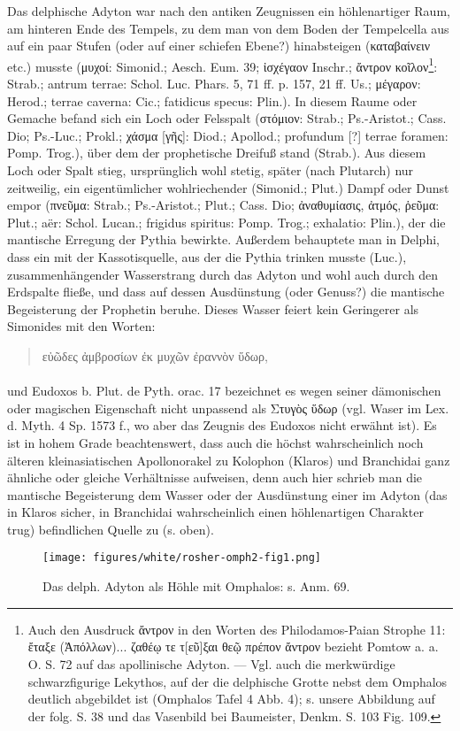 \documentclass[a4paper, 11pt, oneside]{article}
\begin{document}
Das delphische Adyton war nach den antiken Zeugnissen ein höhlenartiger Raum, am hinteren Ende des Tempels, zu dem man von dem Boden der Tempelcella aus auf ein paar Stufen (oder auf einer schiefen Ebene?) hinabsteigen (καταβαίνειν etc.) musste (μυχοί: Simonid.; Aesch. Eum. 39; ἰσχέγαον Inschr.; ἄντρον κοῖλον\footnote{Auch den Ausdruck ἄντρον in den Worten des Philodamos-Paian Strophe 11: ἔταξε (Ἀπόλλων)... ζαθέῳ τε τ[εῦ]ξαι θεῷ πρέπον ἄντρον bezieht Pomtow a. a. O. S. 72 auf das apollinische Adyton. --- Vgl. auch die merkwürdige schwarzfigurige Lekythos, auf der die delphische Grotte nebst dem Omphalos deutlich abgebildet ist (Omphalos Tafel 4 Abb. 4); s. unsere Abbildung auf der folg. S. 38 und das Vasenbild bei Baumeister, Denkm. S. 103 Fig. 109.}: Strab.; antrum terrae: Schol. Luc. Phars. 5, 71 ff. p. 157, 21 ff. Us.; μέγαρον: Herod.; terrae caverna: Cic.; fatidicus specus: Plin.). In diesem Raume oder Gemache befand sich ein Loch oder Felsspalt (στόμιον: Strab.; Ps.-Aristot.; Cass. Dio; Ps.-Luc.; Prokl.; χάσμα [γῆς]: Diod.; Apollod.; profundum [?] terrae foramen: Pomp. Trog.), über dem der prophetische Dreifuß stand (Strab.). Aus diesem Loch oder Spalt stieg, ursprünglich wohl stetig, später (nach Plutarch) nur zeitweilig, ein eigentümlicher wohlriechender (Simonid.; Plut.) Dampf oder Dunst empor (πνεῦμα: Strab.; Ps.-Aristot.; Plut.; Cass. Dio; ἀναθυμίασις, ἀτμός, ῥεῦμα: Plut.; aër: Schol. Lucan.; frigidus spiritus: Pomp. Trog.; exhalatio: Plin.), der die mantische Erregung der Pythia bewirkte. Außerdem behauptete man in Delphi, dass ein mit der Kassotisquelle, aus der die Pythia trinken musste (Luc.), zusammenhängender Wasserstrang durch das Adyton und wohl auch durch den Erdspalte fließe, und dass auf dessen Ausdünstung (oder Genuss?) die mantische Begeisterung der Prophetin beruhe. Dieses Wasser feiert kein Geringerer als Simonides mit den Worten:
\begin{quotation}
εὐῶδες ἀμβροσίων ἐκ μυχῶν ἐραννὸν ὕδωρ,
\end{quotation}
\paragraph{}
und Eudoxos b. Plut. de Pyth. orac. 17 bezeichnet es wegen seiner dämonischen oder magischen Eigenschaft nicht unpassend als Στυγὸς ὕδωρ (vgl. Waser im Lex. d. Myth. 4 Sp. 1573 f., wo aber das Zeugnis des Eudoxos nicht erwähnt ist). Es ist in hohem Grade beachtenswert, dass auch die höchst wahrscheinlich noch älteren kleinasiatischen Apollonorakel zu Kolophon (Klaros) und Branchidai ganz ähnliche oder gleiche Verhältnisse aufweisen, denn auch hier schrieb man die mantische Begeisterung dem Wasser oder der Ausdünstung einer im Adyton (das in Klaros sicher, in Branchidai wahrscheinlich einen höhlenartigen Charakter trug) befindlichen Quelle zu (s. oben).
\begin{figure}[H]
\centering
\texttt{[image: figures/white/rosher-omph2-fig1.png]}
\caption{Das delph. Adyton als Höhle mit Omphalos: s. Anm. 69.}
\end{figure}
\end{document}

